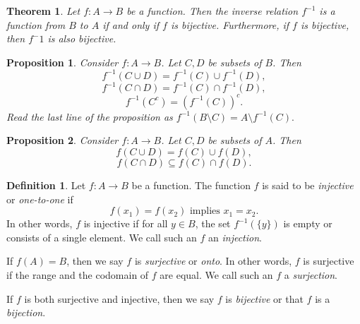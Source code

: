 \documentclass{article}
\newtheorem{theorem}{Theorem}[section]
\newtheorem{proposition}{Proposition}[section]
\theoremstyle{definition}
\newtheorem{definition}{Definition}[section]
\theoremstyle{remark}
\begin{document}
\begin{theorem}
Let $f:A \to B$ be a function. Then the inverse relation $f^{-1}$ is a function from $B$ to $A$ if and only if $f$ is bijective. Furthermore, if $f$ is bijective, then $f^-1$ is also bijective. 
\end{theorem}













\begin{proposition} \label{prop:inverse_image_properties}
Consider \( f: A \to B \). Let \( C, D \) be subsets of \( B \). Then
\[
f^{-1}(C \cup D) = f^{-1}(C) \cup f^{-1}(D),
\]
\[
f^{-1}(C \cap D) = f^{-1}(C) \cap f^{-1}(D),
\]
\[
f^{-1}(C^c) = (f^{-1}(C))^c.
\]
Read the last line of the proposition as $f^{-1}( B \setminus C) = A \setminus f^{-1} (C)\text{.}$
\end{proposition}


























\begin{proposition} \label{prop:direct_image_properties}
Consider \( f: A \to B \). Let \( C, D \) be subsets of \( A \). Then
\[
f(C \cup D) = f(C) \cup f(D),
\]
\[
f(C \cap D) \subseteq f(C) \cap f(D).
\]
\end{proposition}





















\begin{definition} \label{def:injective_surjective_bijective}
Let \( f: A \to B \) be a function. The function \( f \) is said to be \textit{injective} or \textit{one-to-one} if
\[
f(x_1) = f(x_2) \text{ implies } x_1 = x_2.
\]
In other words, \( f \) is injective if for all \( y \in B \), the set \( f^{-1}(\{y\}) \) is empty or consists of a single element. We call such an \( f \) an \textit{injection}.

If \( f(A) = B \), then we say \( f \) is \textit{surjective} or \textit{onto}. In other words, \( f \) is surjective if the range and the codomain of \( f \) are equal. We call such an \( f \) a \textit{surjection}.

If \( f \) is both surjective and injective, then we say \( f \) is \textit{bijective} or that \( f \) is a \textit{bijection}.
\end{definition}
\end{document}

